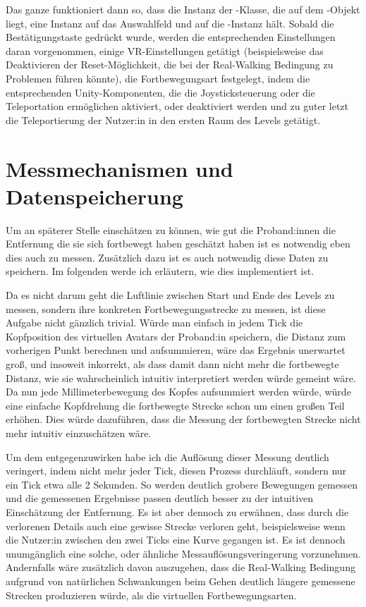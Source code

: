 Das ganze funktioniert dann so, dass die Instanz der -Klasse, die auf dem -Objekt liegt, eine Instanz auf das Auswahlfeld und auf die -Instanz hält. Sobald die Bestätigungstaste gedrückt wurde, werden die entsprechenden Einstellungen daran vorgenommen, einige VR-Einstellungen getätigt (beispielsweise das Deaktivieren der Reset-Möglichkeit, die bei der Real-Walking Bedingung zu Problemen führen könnte), die Fortbewegungsart festgelegt, indem die entsprechenden Unity-Komponenten, die die Joysticksteuerung oder die Teleportation ermöglichen aktiviert, oder deaktiviert werden und zu guter letzt die Teleportierung der Nutzer:in in den ersten Raum des Levels getätigt.

\section{Messmechanismen und Datenspeicherung} \label{sec:measure-distance}
Um an späterer Stelle einschätzen zu können, wie gut die Proband:innen die Entfernung die sie sich fortbewegt haben geschätzt haben ist es notwendig eben dies auch zu messen. Zusätzlich dazu ist es auch notwendig diese Daten zu speichern. Im folgenden werde ich erläutern, wie dies implementiert ist.

Da es nicht darum geht die Luftlinie zwischen Start und Ende des Levels zu messen, sondern ihre konkreten Fortbewegungsstrecke zu messen, ist diese Aufgabe nicht gänzlich trivial. Würde man einfach in jedem Tick die Kopfposition des virtuellen Avatars der Proband:in speichern, die Distanz zum vorherigen Punkt berechnen und aufsummieren, wäre das Ergebnis unerwartet groß, und insoweit inkorrekt, als dass damit dann nicht mehr die fortbewegte Distanz, wie sie wahrscheinlich intuitiv interpretiert werden würde gemeint wäre.
Da nun jede Millimeterbewegung des Kopfes aufsummiert werden würde, würde eine einfache Kopfdrehung die fortbewegte Strecke schon um einen großen Teil erhöhen. Dies würde dazuführen, dass die Messung der fortbewegten Strecke nicht mehr intuitiv einzuschätzen wäre.

Um dem entgegenzuwirken habe ich die Auflösung dieser Messung deutlich veringert, indem nicht mehr jeder Tick, diesen Prozess durchläuft, sondern nur ein Tick etwa alle 2 Sekunden. So werden deutlich grobere Bewegungen gemessen und die gemessenen Ergebnisse passen deutlich besser zu der intuitiven Einschätzung der Entfernung. Es ist aber dennoch zu erwähnen, dass durch die verlorenen Details auch eine gewisse Strecke verloren geht, beispielsweise wenn die Nutzer:in zwischen den zwei Ticks eine Kurve gegangen ist.
Es ist dennoch unumgänglich eine solche, oder ähnliche Messauflösungsveringerung vorzunehmen. Andernfalls wäre zusätzlich davon auszugehen, dass die Real-Walking Bedingung aufgrund von natürlichen Schwankungen beim Gehen deutlich längere gemessene Strecken produzieren würde, als die virtuellen Fortbewegungsarten.

